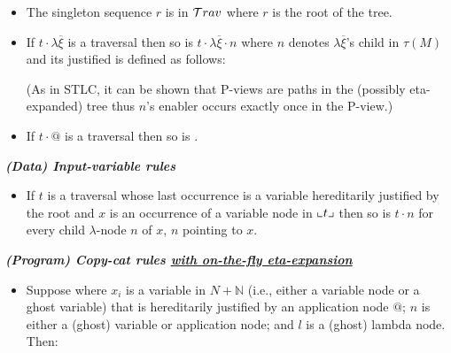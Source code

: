 \documentclass{article}
\theoremstyle{definition}
\newcommand\Nodes{N}%
\begin{document}
\begin{FramedTable}
\begin{itemize}[]
\item{} The singleton sequence $r$ is in $\mathcal{T}rav$ where $r$ is the root of the tree.
\end{itemize}

\begin{itemize}[]
    \item {} If $t \cdot \lambda \overline{\xi}$ is a traversal then so is
        $t \cdot \lambda \overline{\xi} \cdot n$ where $n$
        denotes $\lambda \overline{\xi}$'s child in $\tau(M)$ and its justified is defined as follows:
            (As in STLC, it can be shown that P-views  are paths in the (possibly eta-expanded) tree thus $n$'s enabler occurs exactly once in the P-view.)
    \item {} If $t \cdot @$ is a traversal then so is .
\end{itemize}

\emph{\bf (Data) Input-variable rules}

\begin{itemize}[]
\item {} If $t$ is a traversal whose last occurrence is a variable hereditarily justified by the root and $x$ is an occurrence of a variable node in $\llcorner t \lrcorner$ then
so is $t \cdot n$ for every child $\lambda$-node $n$ of $x$, $n$
pointing to $x$.
\end{itemize}

\emph{\bf (Program) Copy-cat rules \underline{with on-the-fly eta-expansion}}
\begin{itemize}[]
\item{}
Suppose  where $x_i$ is a variable in $\Nodes + \mathbb{N}$ (i.e., either a variable node or a ghost variable) that is hereditarily justified by an application node $@$; $n$ is either a (ghost) variable or application node; and $l$ is a (ghost) lambda node. Then:
    

\end{itemize}
\end{FramedTable}
\end{document}
